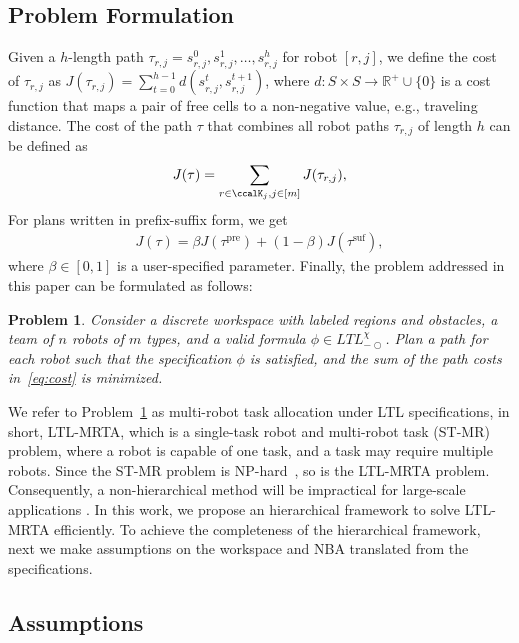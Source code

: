 \documentclass[Afour,sageh,times]{sagej}
\newtheorem{problem}{Problem}
\begin{document}
\subsection{Problem Formulation}
Given a $h$-length path $\tau_{r,j} = s_{r,j}^0, s_{r,j}^1, \ldots, s_{r,j}^h$  for robot $[r,j]$, we define the cost of $\tau_{r,j}$  as $J(\tau_{r,j}) = \sum_{t=0}^{h-1} d(s_{r,j}^{t}, s_{r,j}^{t+1})$, where $d: S\times S \to \mathbb{R}^+\cup\{0\}$ is a cost function that maps a pair of free cells to a non-negative value, e.g., traveling distance. The cost of the path $\tau$ that combines all robot paths $\tau_{r,j}$ of length $h$ can be defined as
\begin{align}
  J(\tau) = \sum_{{r \in \ccalK_j, j \in [m]}} J(\tau_{r,j}),
\end{align}
For  plans written in prefix-suffix form, we get
\begin{align}\label{eq:cost}
J(\tau) = \beta J(\tau^{\text{pre}}) + (1-\beta) J(\tau^{\text{suf}}),
\end{align}
where $\beta\in [0,1]$ is a user-specified parameter. Finally,  the problem addressed in this paper can be  formulated as follows:
\begin{problem}\label{prob:1}
  Consider  a discrete workspace with labeled regions and obstacles, a team of $n$ robots of $m$ types, and a valid formula $\phi\in \textit{LTL}_{-\bigcirc}^\chi$. Plan a path for each robot such that the specification $\phi$ is satisfied, and the sum of the path costs in~\eqref{eq:cost} is minimized.
\end{problem}

We refer to Problem~\ref{prob:1} as multi-robot task allocation under LTL specifications, in short, LTL-MRTA, which is a single-task robot and multi-robot task (ST-MR) problem, where a robot is capable of one task, and a task may require multiple robots. Since the ST-MR problem is NP-hard~\citep{korsah2013comprehensive,nunes2017taxonomy}, so is the LTL-MRTA problem. Consequently, a non-hierarchical method  will be impractical for large-scale applications \citep{sahin2017provably,sahin2017synchronous}. In this work, we propose an hierarchical framework  to solve LTL-MRTA efficiently. To achieve the completeness of the hierarchical framework, next we  make  assumptions on the workspace and NBA translated from the specifications.

\subsection{Assumptions}
\end{document}

